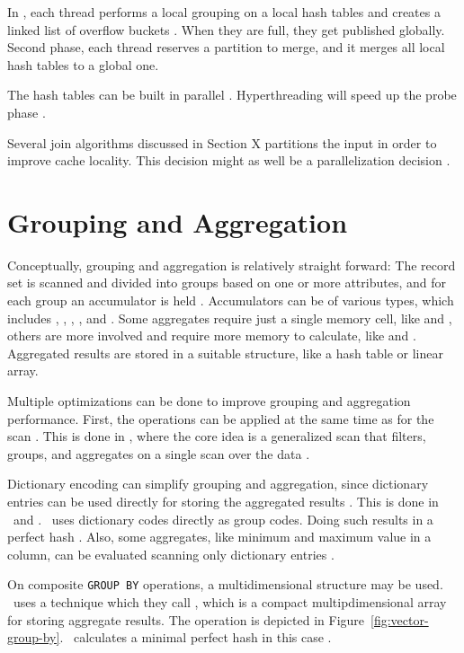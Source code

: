 In \ibm, each thread performs a local grouping on a local hash tables and creates a linked list of overflow buckets \cite{Raman2013-em}. When they are full, they get published globally. Second phase, each thread reserves a partition to merge, and it merges all local hash tables to a global one.

The hash tables can be built in parallel \cite{Barber2014-ey}. Hyperthreading will speed up the probe phase .

Several join algorithms discussed in Section X partitions the input in order to improve cache locality. This decision might as well be a parallelization decision \cite{Neumann1011-uq}.

\section{Grouping and Aggregation}
\label{sec:Grouping and Aggregation}
Conceptually, grouping and aggregation is relatively straight forward: The record set is scanned and divided into groups based on one or more attributes, and for each group an accumulator is held \cite{Bratbergsengen2015-ed}. Accumulators can be of various types, which includes , , , , and . Some aggregates require just a single memory cell, like  and , others are more involved and require more memory to calculate, like  and . Aggregated results are stored in a suitable structure, like a hash table or linear array. 

Multiple optimizations can be done to improve grouping and aggregation performance. First, the operations can be applied at the same time as for the scan \cite{Lemke2010-is}. This is done in \blink, where the core idea is a generalized scan that filters, groups, and aggregates on a single scan over the data \cite{Raman2008-gi}.

Dictionary encoding can simplify grouping and aggregation, since dictionary entries can be used directly for storing the aggregated results \cite{Boncz2005-wj, Lemke2010-is}. This is done in \monetx~and \blink. \blink~uses dictionary codes directly as group codes. Doing such results in a perfect hash \cite{Raman2008-gi}. Also, some aggregates, like minimum and maximum value in a column, can be evaluated scanning only  dictionary entries \cite{Lemke2010-is}.

On composite \texttt{GROUP BY} operations, a multidimensional structure may be used. \oracle~uses a technique which they call , which is a compact multipdimensional array for storing aggregate results. The operation is depicted in Figure~\ref{fig:vector-group-by}. \blink~calculates a minimal perfect hash in this case \cite{Raman2008-gi}.

